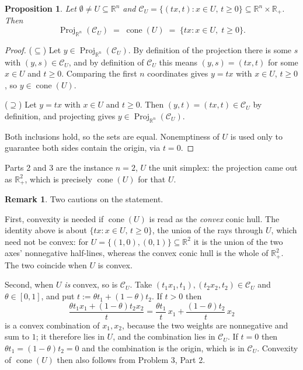 \documentclass[11pt]{article}
\DeclareMathOperator{\cone}{cone}
\DeclareMathOperator{\Proj}{Proj}
\theoremstyle{definition}
\newtheorem{remark}{Remark}
\theoremstyle{plain}
\newtheorem{proposition}{Proposition}
\begin{document}
\begin{proposition}
Let $\emptyset \ne U \subseteq \mathbb{R}^n$ and
$\mathcal{C}_U = \{(tx, t) : x \in U,\, t \ge 0\}
 \subseteq \mathbb{R}^n \times \mathbb{R}_+$. Then
\[
  \Proj_{\mathbb{R}^n}(\mathcal{C}_U)
  \;=\; \cone(U) \;=\; \{ t x : x \in U,\; t \ge 0 \}.
\]
\end{proposition}

\begin{proof}
($\subseteq$) Let $y \in \Proj_{\mathbb{R}^n}(\mathcal{C}_U)$. By
definition of the projection there is some $s$ with
$(y, s) \in \mathcal{C}_U$, and by definition of $\mathcal{C}_U$ this
means $(y,s) = (tx, t)$ for some $x \in U$ and $t \ge 0$. Comparing the
first $n$ coordinates gives $y = tx$ with $x \in U$, $t \ge 0$, so
$y \in \cone(U)$.

($\supseteq$) Let $y = tx$ with $x \in U$ and $t \ge 0$. Then
$(y, t) = (tx, t) \in \mathcal{C}_U$ by definition, and projecting
gives $y \in \Proj_{\mathbb{R}^n}(\mathcal{C}_U)$.

Both inclusions hold, so the sets are equal. Nonemptiness of $U$ is used
only to guarantee both sides contain the origin, via $t = 0$.
\end{proof}

Parts 2 and 3 are the instance $n = 2$, $U$ the unit simplex: the
projection came out as $\mathbb{R}^2_+$, which is precisely
$\cone(U)$ for that $U$.

\begin{remark}
Two cautions on the statement.

First, convexity is needed if $\cone(U)$ is read as the \emph{convex}
conic hull. The identity above is about
$\{tx : x \in U,\, t \ge 0\}$, the union of the rays through $U$, which
need not be convex: for $U = \{(1,0),(0,1)\} \subseteq \mathbb{R}^2$ it
is the union of the two axes' nonnegative half-lines, whereas the convex
conic hull is the whole of $\mathbb{R}^2_+$. The two coincide when $U$
is convex.

Second, when $U$ \emph{is} convex, so is $\mathcal{C}_U$. Take
$(t_1x_1, t_1), (t_2x_2, t_2) \in \mathcal{C}_U$ and
$\theta \in [0,1]$, and put $t := \theta t_1 + (1-\theta)t_2$. If
$t > 0$ then
\[
  \frac{\theta t_1 x_1 + (1-\theta) t_2 x_2}{t}
  = \frac{\theta t_1}{t}\,x_1 + \frac{(1-\theta)t_2}{t}\,x_2
\]
is a convex combination of $x_1, x_2$, because the two weights are
nonnegative and sum to $1$; it therefore lies in $U$, and the
combination lies in $\mathcal{C}_U$. If $t = 0$ then
$\theta t_1 = (1-\theta)t_2 = 0$ and the combination is the origin,
which is in $\mathcal{C}_U$. Convexity of $\cone(U)$ then also follows
from Problem 3, Part 2.
\end{remark}
\end{document}
